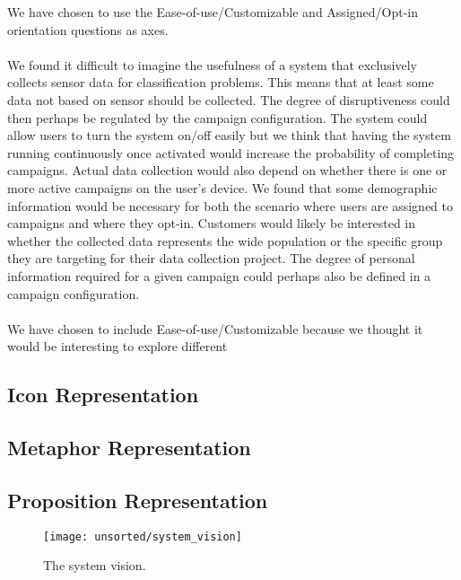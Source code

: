 We have chosen to use the Ease-of-use/Customizable and Assigned/Opt-in orientation questions as axes. 
\\\\
We found it difficult to imagine the usefulness of a system that exclusively collects sensor data for classification problems. This means that at least some data not based on sensor should be collected. The degree of disruptiveness could then perhaps be regulated by the campaign configuration. 
The system could allow users to turn the system on/off easily but we think that having the system running continuously once activated would increase the probability of completing campaigns. Actual data collection would also depend on whether there is one or more active campaigns on the user's device.
We found that some demographic information would be necessary for both the scenario where users are assigned to campaigns and where they opt-in. Customers would likely be interested in whether the collected data represents the wide population or the specific group they are targeting for their data collection project. The degree of personal information required for a given campaign could perhaps also be defined in a campaign configuration. 
\\\\
We have chosen to include Ease-of-use/Customizable because we thought it would be interesting to explore different 







\subsection{Icon Representation}


\subsection{Metaphor Representation}


\subsection{Proposition Representation}


\begin{figure}[!htbp]
    \centering
    \texttt{[image: unsorted/system\_vision]}
    \caption{The system vision.}
    \label{fig:system_vision}
\end{figure}
\FloatBarrier
